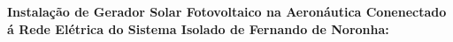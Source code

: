 
\textbf{Instalação de Gerador Solar Fotovoltaico na Aeronáutica Conenectado á
Rede Elétrica do Sistema Isolado de Fernando de Noronha:}
